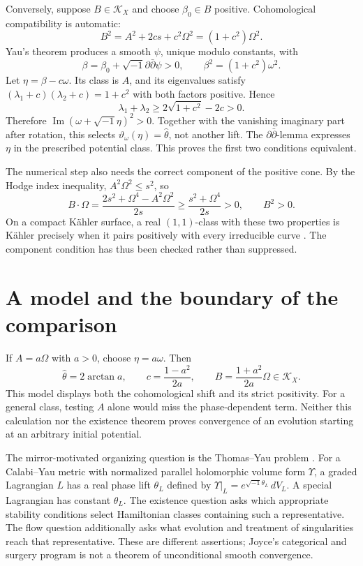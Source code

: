 \documentclass[12pt,reqno]{amsart}
\newcommand{\ii}{\sqrt{-1}}
\newcommand{\ddc}{\ii\partial\bar\partial}
\newcommand{\K}{\mathcal K}
\begin{document}
Conversely, suppose $B\in\K_X$ and choose $\beta_0\in B$ positive.
Cohomological compatibility is automatic:
\[
 B^2=A^2+2cs+c^2\Omega^2=(1+c^2)\Omega^2.
\]
Yau's theorem \cite{Yau} produces a smooth $\psi$, unique modulo constants,
with
\[
 \beta=\beta_0+\ddc\psi>0,
 \qquad \beta^2=(1+c^2)\omega^2.
\]
Let $\eta=\beta-c\omega$. Its class is $A$, and its eigenvalues satisfy
$(\lambda_1+c)(\lambda_2+c)=1+c^2$ with both factors positive. Hence
\[
 \lambda_1+\lambda_2
 \geq 2\sqrt{1+c^2}-2c>0.
\]
Therefore $\operatorname{Im}(\omega+\ii\eta)^2>0$.
Together with the vanishing imaginary part after rotation, this selects
$\vartheta_\omega(\eta)=\widehat\theta$, not another lift.
The $\partial\bar\partial$-lemma expresses $\eta$ in the prescribed
potential class. This proves the first two conditions equivalent.

The numerical step also needs the correct component of the positive cone.
By the Hodge index inequality, $A^2\Omega^2\leq s^2$, so
\[
 B\cdot\Omega
 =\frac{2s^2+\Omega^4-A^2\Omega^2}{2s}
 \geq\frac{s^2+\Omega^4}{2s}>0,
 \qquad B^2>0.
\]
On a compact K\"ahler surface, a real $(1,1)$-class with these two properties
is K\"ahler precisely when it pairs positively with every irreducible
curve \cite{DP}. The component condition has thus been checked rather
than suppressed.

\section{A model and the boundary of the comparison}
If $A=a\Omega$ with $a>0$, choose $\eta=a\omega$. Then
\[
 \widehat\theta=2\arctan a,\qquad
 c=\frac{1-a^2}{2a},\qquad
 B=\frac{1+a^2}{2a}\Omega\in\K_X.
\]
This model displays both the cohomological shift and its strict positivity.
For a general class, testing $A$ alone would miss the phase-dependent term.
Neither this calculation nor the existence theorem proves convergence of
an evolution starting at an arbitrary initial potential.

The mirror-motivated organizing question is the Thomas--Yau problem
\cite{TY}. For a Calabi--Yau metric with normalized parallel holomorphic volume form
$\Upsilon$, a graded Lagrangian $L$ has a real phase lift $\theta_L$ defined by
$\Upsilon|_L=e^{\ii\theta_L}\,dV_L$. A special Lagrangian has constant
$\theta_L$. The existence question asks which appropriate stability
conditions select Hamiltonian classes containing such a representative.
The flow question additionally asks what evolution and treatment of
singularities reach that representative. These are different assertions;
Joyce's categorical and surgery program \cite{Joy} is not a theorem of
unconditional smooth convergence.
\end{document}
